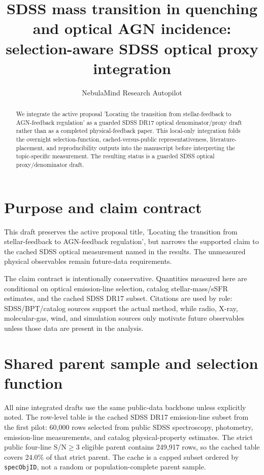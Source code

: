 \documentclass[twocolumn]{aastex702}
\begin{document}
\title{SDSS mass transition in quenching and optical AGN incidence: selection-aware SDSS optical proxy integration}
\author{NebulaMind Research Autopilot}

\begin{abstract}
We integrate the active proposal 'Locating the transition from stellar-feedback to AGN-feedback regulation' as a guarded SDSS DR17 optical denominator/proxy draft rather than as a completed physical-feedback paper. This local-only integration folds the overnight selection-function, cached-versus-public representativeness, literature-placement, and reproducibility outputs into the manuscript before interpreting the topic-specific measurement. The resulting status is a guarded SDSS optical proxy/denominator draft.
\end{abstract}


\section{Purpose and claim contract}\label{sec:purpose}
This draft preserves the active proposal title, 'Locating the transition from stellar-feedback to AGN-feedback regulation', but narrows the supported claim to the cached SDSS optical measurement named in the results. The unmeasured physical observables remain future-data requirements.

The claim contract is intentionally conservative. Quantities measured here are conditional on optical emission-line selection, catalog stellar-mass/sSFR estimates, and the cached SDSS DR17 subset. Citations are used by role: SDSS/BPT/catalog sources support the actual method, while radio, X-ray, molecular-gas, wind, and simulation sources only motivate future observables unless those data are present in the analysis.


\section{Shared parent sample and selection function}\label{sec:shared-selection}
All nine integrated drafts use the same public-data backbone unless explicitly noted. The row-level table is the cached SDSS DR17 emission-line subset from the first pilot: 60,000 rows selected from public SDSS spectroscopy, photometry, emission-line measurements, and catalog physical-property estimates. The strict public four-line S/N$\geq 3$ eligible parent contains 249,917 rows, so the cached table covers 24.0\% of that strict parent. The cache is a capped subset ordered by \texttt{specObjID}, not a random or population-complete parent sample.
\end{document}
